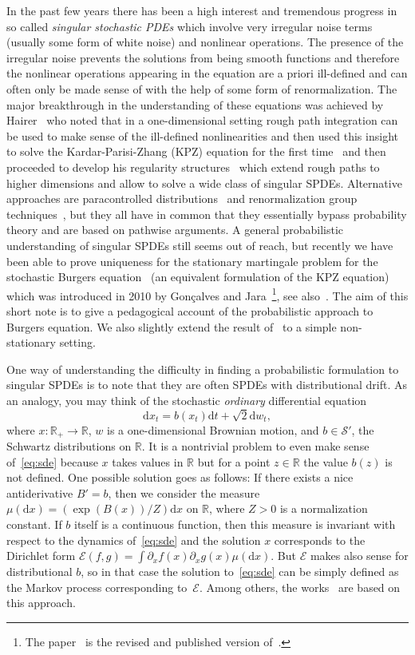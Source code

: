 \documentclass[a4paper,11pt]{article}
\newcommand{\CS}{\mathscr{S}}
\newcommand{\R}{\mathbb{R}}
\newcommand{\1}{\mathds{1}}
\newcommand{\dd}{\mathrm{d}}
\begin{document}
In the past few years there has been a high interest and tremendous progress in so called \emph{singular stochastic PDEs} which involve very irregular noise terms (usually some form of white noise) and nonlinear operations. The presence of the irregular noise  prevents the solutions from being smooth functions and therefore the nonlinear operations appearing in the equation are a priori ill-defined and can often only be made sense of with the help of some form of renormalization. The major breakthrough in the understanding of these equations was achieved by Hairer~\cite{H12} who noted that in a one-dimensional setting rough path integration can be used to make sense of the ill-defined nonlinearities and then used this insight to solve the Kardar-Parisi-Zhang (KPZ) equation for the first time~\cite{H13KPZ} and then proceeded to develop his regularity structures~\cite{H14} which extend rough paths to higher dimensions and allow to solve a wide class of singular SPDEs. Alternative approaches are paracontrolled distributions~\cite{GIP15} and renormalization group techniques~\cite{K16}, but they all have in common that they essentially bypass probability theory and are based on pathwise arguments. A general probabilistic understanding of singular SPDEs still seems out of reach, but recently we have been able to prove uniqueness for the stationary martingale problem for the stochastic Burgers equation~\cite{GP16} (an equivalent formulation of the KPZ equation) which was introduced in 2010 by Gon\c calves and Jara~\cite{GJ10, GJ14}\footnote{The paper~\cite{GJ14} is the revised and published version of~\cite{GJ10}.}, see also~\cite{GJ13}. The aim of this short note is to give a pedagogical account of the probabilistic approach to Burgers equation. We also slightly extend the result of~\cite{GP16} to a simple non-stationary setting.

One way of understanding the difficulty in finding a probabilistic formulation to singular SPDEs is to note that they are often SPDEs with distributional drift. As an analogy, you may think of the stochastic \emph{ordinary} differential equation
  \begin{equation}\label{eq:sde}
     \dd x_t = b(x_t) \dd t + \sqrt{2} \dd w_t,
  \end{equation}
  where $x \colon \R_+ \to \R$, $w$ is a one-dimensional Brownian motion, and $b \in \CS'$, the Schwartz distributions on $\R$. It is a nontrivial problem to even make sense of~\eqref{eq:sde} because $x$ takes values in $\R$ but for a point $z \in \R$ the value $b(z)$ is not defined. One possible solution goes as follows: If there exists a nice antiderivative $B'=b$, then we consider the measure $\mu(\dd x) = (\exp( B(x)) /Z)\dd x$ on $\R$, where $Z>0$ is a normalization constant. If $b$ itself is a continuous function, then this measure is invariant with respect to the dynamics of~\eqref{eq:sde} and the solution $x$ corresponds to the Dirichlet form $\mathcal{E}(f,g) = \int \partial_x f(x) \partial_x g(x) \mu (\dd x)$. But $\mathcal{E}$ makes also sense for distributional $b$, so in that case the solution to~\eqref{eq:sde} can be simply defined as the Markov process corresponding to~$\mathcal{E}$. Among others, the works~\cite{Mathieu1994, Mathieu1995} are based on this approach.
  
\end{document}
